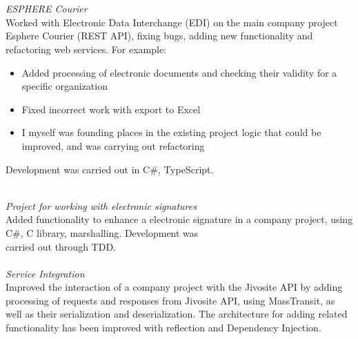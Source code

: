 \documentclass[
	a4paper,
]{fortysecondscv}
\begin{document}
\par
\makefrontsidebar{}

\begin{cvtable}[1.5]
   \\

    {\\ \emph{ESPHERE Courier} \\
     Worked with Electronic Data Interchange (\colorbox{cvsidecolor}{EDI}) on the main company project Esphere Courier (\colorbox{cvsidecolor}{REST API}), fixing bugs, adding new functionality and refactoring web services. For example:
     \begin{itemize}
         \item Added processing of electronic documents and checking their validity for a specific organization
         \item Fixed incorrect work with export to Excel
         \item I myself was founding places in the existing project logic that could be improved, and was carrying out refactoring
     \end{itemize}
     Development was carried out in \colorbox{cvsidecolor}{C\#}, \colorbox{cvsidecolor}{TypeScript}.
    }

\end{cvtable}

\begin{cvtable}[1.5]

	{\\ \emph{Project for working with electronic signatures} \\
    Added functionality to enhance a electronic signature in a company project, using \colorbox{cvsidecolor}{C\#}, \colorbox{cvsidecolor}{C library},  \colorbox{cvsidecolor}{marshalling}. Development was \\ carried out through \colorbox{cvsidecolor}{TDD}. \\ \\
     \emph{Service Integration} \\
     Improved the interaction of a company project with the Jivosite API by adding processing of requests and responses from Jivosite API, using \colorbox{cvsidecolor}{MassTransit}, as well as their serialization and deserialization. The architecture for adding related functionality has been improved with \colorbox{cvsidecolor}{reflection} and \colorbox{cvsidecolor}{Dependency Injection}.
    }

\end{cvtable}
\end{document}
